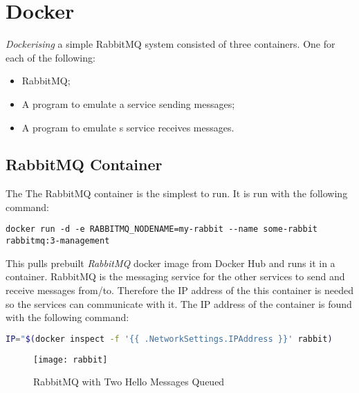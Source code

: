 \section{Docker}

\textit{Dockerising} a simple RabbitMQ system consisted of three containers. One for each of the following: 
\begin{itemize}
	\item RabbitMQ;
	\item A program to emulate a service sending messages;
	\item A program to emulate s service receives messages.
\end{itemize}

\subsection{RabbitMQ Container}
The The RabbitMQ container is the simplest to run. It is run with the following command:
\begin{lstlisting}
docker run -d -e RABBITMQ_NODENAME=my-rabbit --name some-rabbit rabbitmq:3-management
\end{lstlisting}
This pulls prebuilt \textit{RabbitMQ} docker image from Docker Hub and runs it in a container. RabbitMQ is the messaging service for the other services to send and receive messages from/to. Therefore the IP address of the this container is needed so the services can communicate with it. The IP address of the container is found with the following command:
\begin{lstlisting}[language=bash]
IP="$(docker inspect -f '{{ .NetworkSettings.IPAddress }}' rabbit)
\end{lstlisting}

\begin{figure}[H]
	\setlength{\belowcaptionskip}{15pt plus 3pt minus 2pt}
	\caption{RabbitMQ with Two Hello Messages Queued}
	\centering
	\texttt{[image: rabbit]}
	\label{fig:rabbit}
\end{figure}

